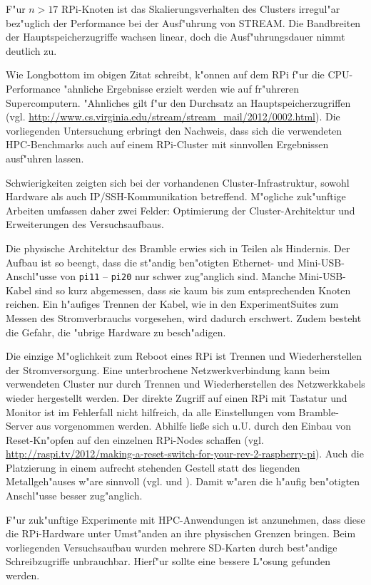 F"ur $n>17$ RPi-Knoten ist das Skalierungsverhalten des Clusters irregul"ar bez"uglich der Performance bei der Ausf"uhrung von STREAM. Die Bandbreiten der Hauptspeicherzugriffe wachsen linear, doch die Ausf"uhrungsdauer nimmt deutlich zu. 

Wie Longbottom im obigen Zitat schreibt, k"onnen auf dem RPi f"ur die CPU-Performance "ahnliche Ergebnisse erzielt werden wie auf fr"uhreren Supercomputern. "Ahnliches gilt f"ur den Durchsatz an Hauptspeicherzugriffen (vgl. \url{http://www.cs.virginia.edu/stream/stream_mail/2012/0002.html}). Die vorliegenden Untersuchung erbringt den Nachweis, dass sich die verwendeten HPC-Benchmarks auch auf einem RPi-Cluster mit sinnvollen Ergebnissen ausf"uhren lassen. 

Schwierigkeiten zeigten sich bei der vorhandenen Cluster-Infrastruktur, sowohl Hardware als auch IP/SSH-Kommunikation betreffend. M"ogliche zuk"unftige Arbeiten umfassen daher zwei Felder: Optimierung der Cluster-Architektur und Erweiterungen des Versuchsaufbaus.

Die physische Architektur des Bramble erwies sich in Teilen als Hindernis. Der Aufbau ist so beengt, dass die st"andig ben"otigten Ethernet- und Mini-USB-Anschl"usse von \texttt{pi11} -- \texttt{pi20} nur schwer zug"anglich sind. Manche Mini-USB-Kabel sind so kurz abgemessen, dass sie kaum bis zum entsprechenden Knoten reichen. Ein h"aufiges Trennen der Kabel, wie in den ExperimentSuites zum Messen des Stromverbrauchs vorgesehen, wird dadurch erschwert. Zudem besteht die Gefahr, die "ubrige Hardware zu besch"adigen. 

Die einzige M"oglichkeit zum Reboot eines RPi ist Trennen und Wiederherstellen der Stromversorgung. Eine unterbrochene Netzwerkverbindung kann beim verwendeten Cluster nur durch Trennen und Wiederherstellen des Netzwerkkabels wieder hergestellt werden. Der direkte Zugriff auf einen RPi mit Tastatur und Monitor ist im Fehlerfall nicht hilfreich, da alle Einstellungen vom Bramble-Server aus vorgenommen werden. Abhilfe lie\ss e sich u.U. durch den Einbau von Reset-Kn"opfen auf den einzelnen RPi-Nodes schaffen (vgl. \url{http://raspi.tv/2012/making-a-reset-switch-for-your-rev-2-raspberry-pi}). Auch die Platzierung in einem aufrecht stehenden Gestell statt des liegenden Metallgeh"auses w"are sinnvoll (vgl. \cite{kie01} und \cite{cox13}). Damit w"aren die h"aufig ben"otigten Anschl"usse besser zug"anglich. 

F"ur zuk"unftige Experimente mit HPC-Anwendungen ist anzunehmen, dass diese die RPi-Hardware unter Umst"anden an ihre physischen Grenzen bringen. Beim vorliegenden Versuchsaufbau wurden mehrere SD-Karten durch best"andige Schreibzugriffe unbrauchbar. Hier\-f"ur sollte eine bessere L"osung gefunden werden. 

